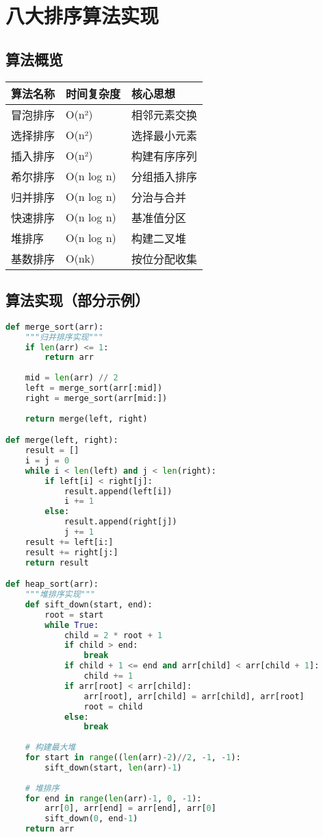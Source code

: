 \documentclass{article}
\begin{document}
\section{八大排序算法实现}
\subsection{算法概览}
\begin{tabularx}{\textwidth}{|l|l|l|}
\hline
算法名称 & 时间复杂度 & 核心思想 \\
\hline
冒泡排序 & O(n²) & 相邻元素交换 \\
选择排序 & O(n²) & 选择最小元素 \\
插入排序 & O(n²) & 构建有序序列 \\
希尔排序 & O(n log n) & 分组插入排序 \\
归并排序 & O(n log n) & 分治与合并 \\
快速排序 & O(n log n) & 基准值分区 \\
堆排序 & O(n log n) & 构建二叉堆 \\
基数排序 & O(nk) & 按位分配收集 \\
\hline
\end{tabularx}

\subsection{算法实现（部分示例）}
\begin{lstlisting}[language=Python]
def merge_sort(arr):
    """归并排序实现"""
    if len(arr) <= 1:
        return arr
    
    mid = len(arr) // 2
    left = merge_sort(arr[:mid])
    right = merge_sort(arr[mid:])
    
    return merge(left, right)

def merge(left, right):
    result = []
    i = j = 0
    while i < len(left) and j < len(right):
        if left[i] < right[j]:
            result.append(left[i])
            i += 1
        else:
            result.append(right[j])
            j += 1
    result += left[i:]
    result += right[j:]
    return result

def heap_sort(arr):
    """堆排序实现"""
    def sift_down(start, end):
        root = start
        while True:
            child = 2 * root + 1
            if child > end:
                break
            if child + 1 <= end and arr[child] < arr[child + 1]:
                child += 1
            if arr[root] < arr[child]:
                arr[root], arr[child] = arr[child], arr[root]
                root = child
            else:
                break
    
    # 构建最大堆
    for start in range((len(arr)-2)//2, -1, -1):
        sift_down(start, len(arr)-1)
    
    # 堆排序
    for end in range(len(arr)-1, 0, -1):
        arr[0], arr[end] = arr[end], arr[0]
        sift_down(0, end-1)
    return arr
\end{lstlisting}
\end{document}
